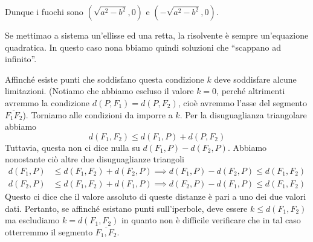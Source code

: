 \documentclass[a4paper]{article}
\begin{document}
Dunque i fuochi sono \((\sqrt{a^2 - b^2}, 0)\) e \((-\sqrt{a^2 - b^2}, 0)\).


Se mettimao a sistema un'ellisse ed una retta, la risolvente è sempre un'equazione quadratica.
In questo caso nona bbiamo quindi soluzioni che ``scappano ad infinito''.

\pagebreak


Affinché esiste punti che soddisfano questa condizione \(k\) deve soddisfare alcune limitazioni.
(Notiamo che abbiamo escluso il valore \(k=0\), perché altrimenti avremmo la condizione \(d(P, F_1)=d(P,F_2)\),
cioè avremmo l'asse del segmento \(\overline{F_1F_2}\)).
Torniamo alle condizioni da imporre a \(k\).
Per la disuguaglianza triangolare abbiamo
\[
    d(F_1, F_2) \leq d(F_1, P) + d(P, F_2)
\]
Tuttavia, questa non ci dice nulla su \(d(F_1, P) - d(F_2, P)\).
Abbiamo nonostante ciò altre due disuguaglianze triangoli
\begin{align*}
    d(F_1, P) &\leq d(F_1, F_2) + d(F_2, P) \implies d(F_1, P) - d(F_2, P) \leq d(F_1, F_2) \\
    d(F_2, P) &\leq d(F_1, F_2) + d(F_1, P) \implies d(F_2, P) - d(F_1, P) \leq d(F_1, F_2)
\end{align*}
Questo ci dice che il valore assoluto di queste distanze è pari a uno dei due valori dati.
Pertanto, se affinché esistano punti sull'iperbole, deve essere \(k \leq d(F_1, F_2)\)
ma escludiamo \(k=d(F_1, F_2)\) in quanto non è difficile verificare che in tal caso
otterremmo il segmento \(\overline{F_1, F_2}\).
\end{document}
